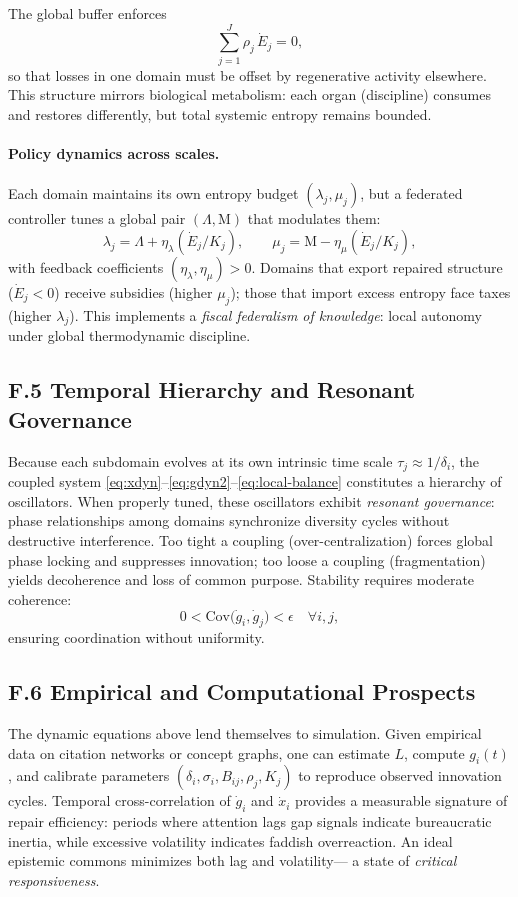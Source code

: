 \documentclass[11pt,a4paper,titlepage]{article}
\theoremstyle{definition}
\begin{document}
\begin{itemize}
The global buffer enforces
\begin{equation}
\sum_{j=1}^J \rho_j\,\dot{E}_j = 0,
\label{eq:global-balance}
\end{equation}
so that losses in one domain must be offset by regenerative activity elsewhere.
This structure mirrors biological metabolism:
each organ (discipline) consumes and restores differently,
but total systemic entropy remains bounded.

\paragraph{Policy dynamics across scales.}
Each domain maintains its own entropy budget $(\lambda_j,\mu_j)$,
but a federated controller tunes a global pair $(\Lambda,\mathrm{M})$
that modulates them:
\[
\lambda_j = \Lambda + \eta_\lambda (\dot{E}_j/K_j),
\qquad
\mu_j = \mathrm{M} - \eta_\mu (\dot{E}_j/K_j),
\]
with feedback coefficients $(\eta_\lambda,\eta_\mu)\!>\!0$.
Domains that export repaired structure (\(\dot{E}_j<0\))
receive subsidies (higher $\mu_j$);
those that import excess entropy face taxes (higher $\lambda_j$).
This implements a \emph{fiscal federalism of knowledge}:
local autonomy under global thermodynamic discipline.

\subsection*{F.5 Temporal Hierarchy and Resonant Governance}

Because each subdomain evolves at its own intrinsic time scale $\tau_j\approx1/\delta_i$,
the coupled system \eqref{eq:xdyn}--\eqref{eq:gdyn2}--\eqref{eq:local-balance}
constitutes a hierarchy of oscillators.
When properly tuned, these oscillators exhibit
\emph{resonant governance}:
phase relationships among domains synchronize diversity cycles
without destructive interference.
Too tight a coupling (over-centralization) forces global phase locking
and suppresses innovation;
too loose a coupling (fragmentation) yields decoherence and loss of common purpose.
Stability requires moderate coherence:
\[
0 < \text{Cov}\!\big(\dot g_i,\dot g_j\big) < \epsilon
\quad \forall i,j,
\]
ensuring coordination without uniformity.

\subsection*{F.6 Empirical and Computational Prospects}

The dynamic equations above lend themselves to simulation.
Given empirical data on citation networks or concept graphs,
one can estimate $L$, compute $g_i(t)$,
and calibrate parameters $(\delta_i,\sigma_i,B_{ij},\rho_j,K_j)$
to reproduce observed innovation cycles.
Temporal cross-correlation of $\dot g_i$ and $\dot x_i$
provides a measurable signature of repair efficiency:
periods where attention lags gap signals indicate bureaucratic inertia,
while excessive volatility indicates faddish overreaction.
An ideal epistemic commons minimizes both lag and volatility—
a state of \emph{critical responsiveness}.


\end{itemize}
\end{document}
